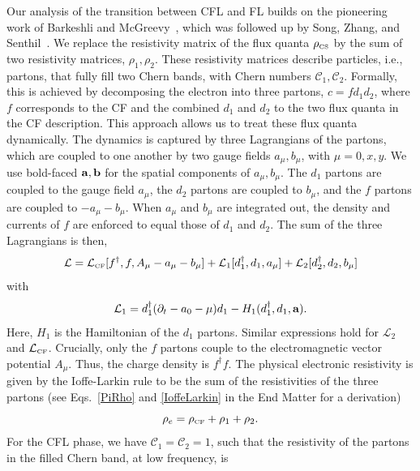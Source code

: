 \documentclass[aps,prl,twocolumn,superscriptaddress,floatfix, 10pt,longbibliography, nofootinbib]{revtex4-2}
\begin{document}
Our analysis of the transition between CFL and FL builds on the pioneering work of Barkeshli and McGreevy~\cite{barkeshli_continuous_2012}, which was followed up by Song, Zhang, and Senthil~\cite {song_phase_2024}.
We replace the resistivity matrix of the flux quanta $\rho_\text{\tiny CS}$ by the sum of two resistivity matrices, $\rho_1,\rho_2$. These resistivity matrices describe particles, i.e., partons, that fully fill two Chern bands, with Chern numbers $\mathcal{C}_1,\mathcal{C}_2$.
Formally, this is achieved by decomposing the electron into three partons, $c = f d_1 d_2$, where $f$ corresponds to the CF and the combined $d_1$ and $d_2$ to the two flux quanta in the CF description. This approach allows us to treat these flux quanta dynamically. The dynamics is captured by three Lagrangians of the partons, which are coupled to one another by two gauge fields ${ a_\mu},{ b_\mu}$, with $\mu=0,x,y$. We use bold-faced ${\bf a,b}$ for the spatial components of $a_\mu,b_\mu$. The $d_1$ partons are coupled to the gauge field ${ a_\mu}$, the $d_2$ partons are coupled to ${ b_\mu}$, and the $f$ partons are coupled to $-a_\mu-b_\mu$. When $a_\mu$ and $b_\mu$ are integrated out, the density and currents of $f$ are enforced to equal those of $d_1$ and $d_2$. The sum of the three Lagrangians is then,
\begin{equation}
    \mathcal{L}=\mathcal{L}_\text{\tiny CF}[f^\dagger,f,A_\mu-a_\mu-b_\mu]+\mathcal{L}_1[d_1^\dagger,d_1,a_\mu]+\mathcal{L}_2[d_2^\dagger,d_2,b_\mu]
    \label{Lagrangians}
\end{equation}
with
\begin{equation}
    \mathcal{L}_1=d_1^\dagger(\partial_t-a_0-\mu)d_1-H_1(d_1^\dagger,d_1, {\bf a}).
    \label{Lagrangian1}
\end{equation}
Here, $H_1$ is the Hamiltonian of the $d_1$ partons. Similar expressions hold for $\mathcal{L}_2$ and $\mathcal{L}_\text{\tiny CF}$.
Crucially, only the $f$ partons couple to the electromagnetic vector potential $A_\mu$. Thus, the charge density is $f^\dagger f$.
The physical electronic resistivity is given by the Ioffe-Larkin rule to be the sum of the resistivities of the three partons (see Eqs.~\eqref{PiRho} and \eqref{IoffeLarkin} in the End Matter for a derivation)
\begin{equation}\rho_e=\rho_\text{\tiny CF}+\rho_1+\rho_2.
\label{ILRrhos}
\end{equation}
For the CFL phase, we have $\mathcal{C}_1=\mathcal{C}_2=1$, such that the resistivity of the partons in the filled Chern band, at low frequency, is
\end{document}
